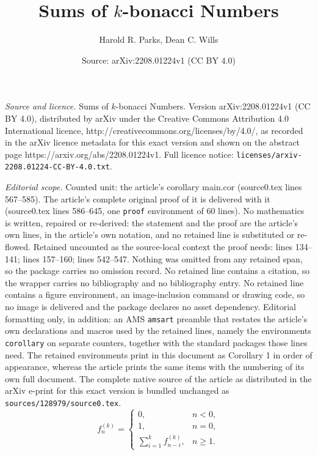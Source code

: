 \documentclass[10pt,a4paper]{amsart}
\title{Sums of $k$-bonacci Numbers}
\author{Harold R. Parks, Dean C. Wills}
\date{Source: arXiv:2208.01224v1 (CC BY 4.0)}
\begin{document}
\maketitle

\noindent\emph{Source and licence.} Sums of $k$-bonacci Numbers. Version arXiv:2208.01224v1 (CC BY 4.0), distributed by arXiv under the Creative Commons Attribution 4.0 International licence, http://creativecommons.org/licenses/by/4.0/, as recorded in the arXiv licence metadata for this exact version and shown on the abstract page https://arxiv.org/abs/2208.01224v1. Full licence notice: \texttt{licenses/arxiv-2208.01224-CC-BY-4.0.txt}.\par\smallskip

\noindent\textit{Editorial scope.} Counted unit: the article's corollary main.cor (source0.tex lines 567--585). The article's complete original proof of it is delivered with it (source0.tex lines 586--645, one \texttt{proof} environment of 60 lines). No mathematics is written, repaired or re-derived: the statement and the proof are the article's own lines, in the article's own notation, and no retained line is substituted or re-flowed.  Retained uncounted as the source-local context the proof needs: lines 134--141; lines 157--160; lines 542--547.  Nothing was omitted from any retained span, so the package carries no omission record.  No retained line contains a citation, so the wrapper carries no bibliography and no bibliography entry.  No retained line contains a figure environment, an image-inclusion command or drawing code, so no image is delivered and the package declares no asset dependency.  Editorial formatting only, in addition: an AMS \texttt{amsart} preamble that restates the article's own declarations and macros used by the retained lines, namely the environments \texttt{corollary} on separate counters, together with the standard packages those lines need.  The retained environments print in this document as Corollary 1 in order of appearance, whereas the article prints the same items with the numbering of its own full document.  The complete native source of the article as distributed in the arXiv e-print for this exact version is bundled unchanged as \texttt{sources/128979/source0.tex}.
\begin{equation}\label{fib.recur}
f_n^{(k)} = 
\begin{cases}
       0, &   n < 0, \\
       1, &   n = 0, \\
            \sum_{i=1}^k f_{n-i}^{(k)}, & n\geq 1.
\end{cases}
\end{equation}
\end{document}
